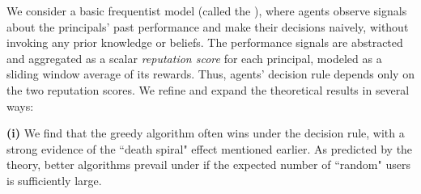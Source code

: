 

We consider a basic frequentist model (called the \emph{\ExptsModel}), where agents observe signals about the principals' past performance and 
make their decisions naively,
without invoking any prior knowledge or beliefs. The performance signals are abstracted and aggregated as a scalar \emph{reputation score} for each principal, modeled as a sliding window average of its rewards. Thus, agents' decision rule depends only on the two reputation scores.
We refine and expand the theoretical results in several ways:

\textbf{(i)}
We find that the greedy algorithm often wins under the \HardMax decision rule, with a strong evidence of the ``death spiral" effect mentioned earlier.
 As predicted by the theory, better algorithms prevail under \HardMaxRandom if the expected number of ``random" users is sufficiently large.


